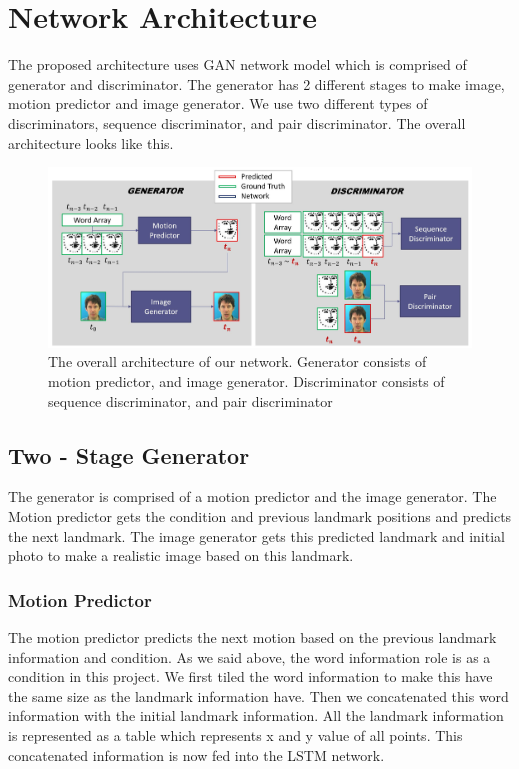 \documentclass[10pt,twocolumn,letterpaper]{article}
\begin{document}
\section{Network Architecture}
The proposed architecture uses GAN network model which is comprised of generator and discriminator. The generator has 2 different stages to make image, motion predictor and image generator. We use two different types of discriminators, sequence discriminator, and pair discriminator. The overall architecture looks like this.
\begin{figure}
\begin{center}
\includegraphics [scale=0.3] {images/network.JPG}
\end{center}
 \caption{The overall architecture of our network.  Generator consists of motion predictor, and image generator. Discriminator consists of sequence discriminator, and pair discriminator}
\label{fig:short}
\end{figure}


\subsection{Two - Stage Generator}
The generator is comprised of a motion predictor and the image generator. The Motion predictor gets the condition and previous landmark positions and predicts the next landmark. The image generator gets this predicted landmark and initial photo to make a realistic image based on this landmark.

\subsubsection{Motion Predictor}
The motion predictor predicts the next motion based on the previous landmark information and condition. As we said above, the word information role is as a condition in this project. We first tiled the word information to make this have the same size as the landmark information have. Then we concatenated this word information with the initial landmark information. All the landmark information is represented as a table which represents x and y value of all points. This concatenated information is now fed into the LSTM network.
\end{document}
